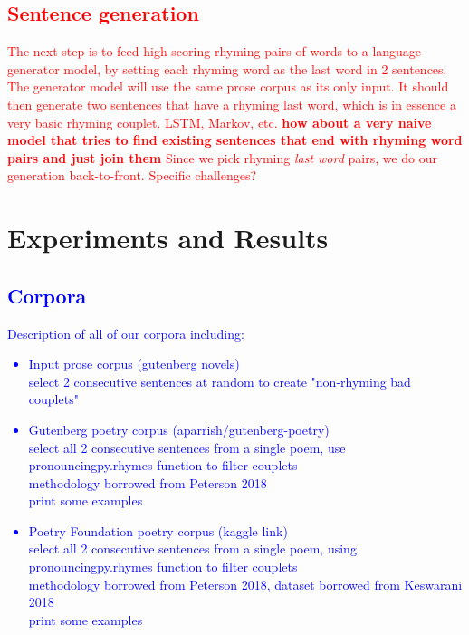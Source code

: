 \documentclass[11pt,a4paper]{article}
\begin{document}
\textcolor{red}{
\subsection{Sentence generation}
\label{sec:languagegen}
The next step is to feed high-scoring rhyming pairs of words to a language generator model, by setting each rhyming word as the last word in 2 sentences. The generator model will use the same prose corpus as its only input. It should then generate two sentences that have a rhyming last word, which is in essence a very basic rhyming couplet.
LSTM, Markov, etc.
\textbf{how about a very naive model that tries to find existing sentences that end with rhyming word pairs and just join them}
Since we pick rhyming \textit{last word} pairs, we do our generation back-to-front. Specific challenges?
}


\section{Experiments and Results}
\label{sec:results}

\textcolor{blue}{
\subsection{Corpora}
\label{sec:corpora}
Description of all of our corpora including:
\begin{itemize}
	\item
		Input prose corpus (gutenberg novels)\\
		select 2 consecutive sentences at random to create "non-rhyming bad couplets"
	\item
		Gutenberg poetry corpus (aparrish/gutenberg-poetry)\\
		select all 2 consecutive sentences from a single poem, use pronouncingpy.rhymes function to filter couplets\\
		methodology borrowed from Peterson 2018\\
		print some examples
	\item
		Poetry Foundation poetry corpus (kaggle link)\\
		select all 2 consecutive sentences from a single poem, using pronouncingpy.rhymes function to filter couplets\\
		methodology borrowed from Peterson 2018, dataset borrowed from Keswarani 2018\\
		print some examples
\end{itemize}
}
\end{document}
